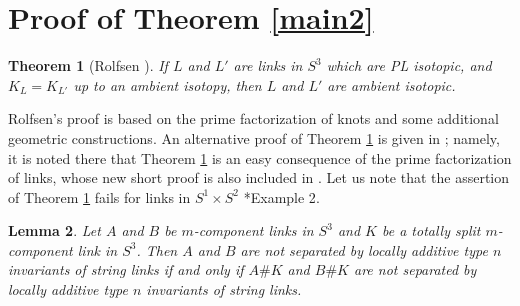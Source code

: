 \documentclass[a4paper,12pt,reqno,oneside]{amsart} %
\theoremstyle{plain}
\newtheorem{theorem}{Theorem}[section]
\newtheorem{lemma}[theorem]{Lemma}
\theoremstyle{definition}
\theoremstyle{named}
\def\x{\times}
\renewcommand{\:}{\colon}
\begin{document}
\section{Proof of Theorem \ref{main2}} \label{proofs2}

\begin{theorem}[Rolfsen \cite{Ro0}] \label{rolfsen-lemma0} If $L$ and $L'$ are links in $S^3$ which are PL isotopic,
and $K_L=K_{L'}$ up to an ambient isotopy, then $L$ and $L'$ are ambient isotopic.
\end{theorem}

Rolfsen's proof is based on the prime factorization of knots and some additional geometric constructions.
An alternative proof of Theorem \ref{rolfsen-lemma0} is given in \cite{M24-1'}; namely, it is noted there that 
Theorem \ref{rolfsen-lemma0} is an easy consequence of the prime factorization of links, whose new short proof 
is also included in \cite{M24-1'}.
Let us note that the assertion of Theorem \ref{rolfsen-lemma0} fails for links in $S^1\x S^2$ \cite{Ro1}*{Example 2}.

\begin{lemma} \label{destabilization}
Let $A$ and $B$ be $m$-component links in $S^3$ and $K$ be a totally split $m$-component link in $S^3$.
Then $A$ and $B$ are not separated by locally additive type $n$ invariants of string links if and only if $A\# K$ and $B\# K$ are not separated 
by locally additive type $n$ invariants of string links.
\end{lemma}
\end{document}
